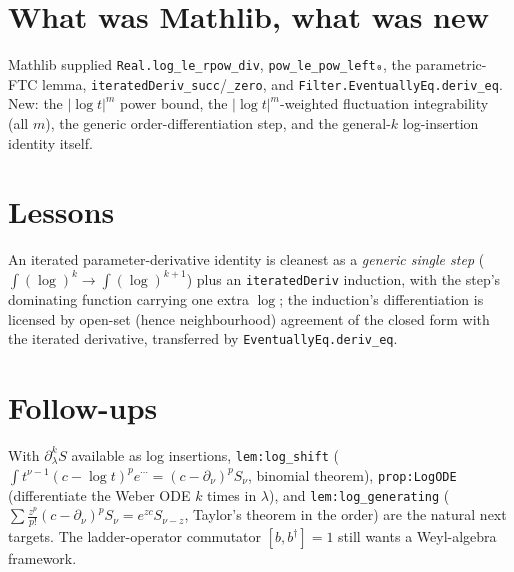 \documentclass[11pt]{article}
\begin{document}
\section{What was Mathlib, what was new}
Mathlib supplied \texttt{Real.log\_le\_rpow\_div}, \texttt{pow\_le\_pow\_left₀}, the parametric-FTC lemma,
\texttt{iteratedDeriv\_succ}/\texttt{\_zero}, and \texttt{Filter.EventuallyEq.deriv\_eq}. New: the
$|\log t|^m$ power bound, the $|\log t|^m$-weighted fluctuation integrability (all $m$), the generic
order-differentiation step, and the general-$k$ log-insertion identity itself.

\section{Lessons}
An iterated parameter-derivative identity is cleanest as a \emph{generic single step}
($\int(\log)^k\to\int(\log)^{k+1}$) plus an \texttt{iteratedDeriv} induction, with the step's dominating
function carrying one extra $\log$; the induction's differentiation is licensed by open-set (hence
neighbourhood) agreement of the closed form with the iterated derivative, transferred by
\texttt{EventuallyEq.deriv\_eq}.

\section{Follow-ups}
With $\partial_\lambda^k S$ available as log insertions, \texttt{lem:log\_shift}
($\int t^{\nu-1}(c-\log t)^p e^{\cdots}=(c-\partial_\nu)^p S_\nu$, binomial theorem),
\texttt{prop:LogODE} (differentiate the Weber ODE $k$ times in $\lambda$), and \texttt{lem:log\_generating}
($\sum \tfrac{z^p}{p!}(c-\partial_\nu)^p S_\nu=e^{zc}S_{\nu-z}$, Taylor's theorem in the order) are the
natural next targets. The ladder-operator commutator $[b,b^\dagger]=1$ still wants a Weyl-algebra
framework.
\end{document}
